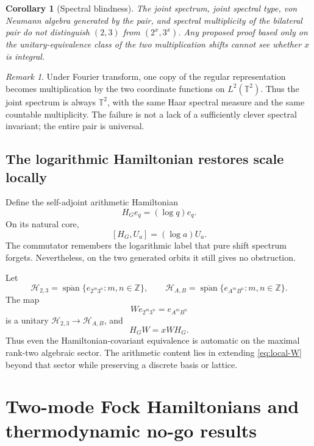 \documentclass[11pt,oneside]{article}
\newtheorem{corollary}[theorem]{Corollary}
\theoremstyle{definition}
\theoremstyle{remark}
\newtheorem{remark}[theorem]{Remark}
\newcommand{\Z}{\mathbb Z}
\newcommand{\spn}{\operatorname{span}}
\newcommand{\cH}{\mathcal H}
\begin{document}
\begin{corollary}[Spectral blindness]\label{cor:spectral-blindness}
The joint spectrum, joint spectral type, von Neumann algebra generated by
the pair, and spectral multiplicity of the bilateral pair do not
distinguish \((2,3)\) from \((2^x,3^x)\).  Any proposed proof based only
on the unitary-equivalence class of the two multiplication shifts cannot
see whether \(x\) is integral.
\end{corollary}

\begin{remark}
Under Fourier transform, one copy of the regular representation becomes
multiplication by the two coordinate functions on \(L^2(\mathbb T^2)\).
Thus the joint spectrum is always \(\mathbb T^2\), with the same Haar spectral
measure and the same countable multiplicity.  The failure is not a lack
of a sufficiently clever spectral invariant; the entire pair is
universal.
\end{remark}

\subsection{The logarithmic Hamiltonian restores scale locally}

Define the self-adjoint arithmetic Hamiltonian
\[
        H_G e_q=(\log q)e_q.
\]
On its natural core,
\begin{equation}\label{eq:comm-H-U}
        [H_G,U_a]=(\log a)U_a.
\end{equation}
The commutator remembers the logarithmic label that pure shift spectrum
forgets.  Nevertheless, on the two generated orbits it still gives no
obstruction.

Let
\[
 \cH_{2,3}=\overline{\spn}\{e_{2^m3^n}:m,n\in\Z\},\qquad
 \cH_{A,B}=\overline{\spn}\{e_{A^mB^n}:m,n\in\Z\}.
\]
The map
\begin{equation}\label{eq:local-W}
        W e_{2^m3^n}=e_{A^mB^n}
\end{equation}
is a unitary \(\cH_{2,3}\to\cH_{A,B}\), and
\begin{equation}\label{eq:local-H-cov}
        H_GW=xWH_G.
\end{equation}
Thus even the Hamiltonian-covariant equivalence is automatic on the
maximal rank-two algebraic sector.  The arithmetic content lies in
extending \eqref{eq:local-W} beyond that sector while preserving a
discrete basis or lattice.

\section{Two-mode Fock Hamiltonians and thermodynamic no-go results}
\end{document}
